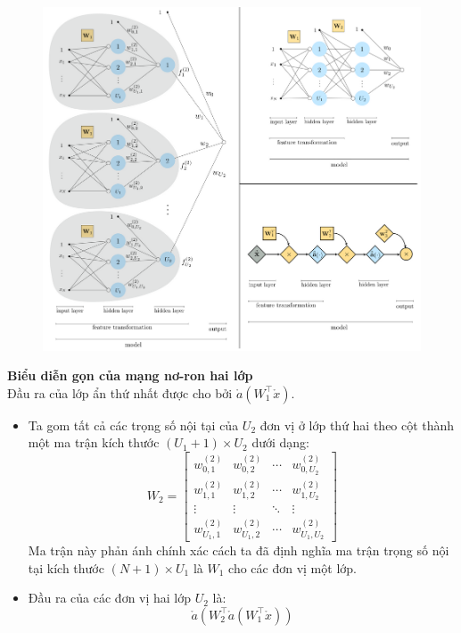\documentclass{book}
\begin{document}
    \begin{figure}[H]
        \centering
        \includegraphics[width=1.0\linewidth]{images/code23.png}
        \label{fig:code23}
    \end{figure}
    \textbf{Biểu diễn gọn của mạng nơ-ron hai lớp}\\
    Đầu ra của lớp ẩn thứ nhất được cho bởi $\mathring{a}(W_1^\top \mathring{x})$.
    \begin{itemize}
        \item Ta gom tất cả các trọng số nội tại của $U_2$ đơn vị ở lớp thứ hai theo cột thành một ma trận kích thước $(U_1 + 1) \times U_2$ dưới dạng:
        \[
        W_2 =
        \begin{bmatrix}
        w^{(2)}_{0,1} & w^{(2)}_{0,2} & \cdots & w^{(2)}_{0,U_2} \\
        w^{(2)}_{1,1} & w^{(2)}_{1,2} & \cdots & w^{(2)}_{1,U_2} \\
        \vdots        & \vdots        & \ddots & \vdots         \\
        w^{(2)}_{U_1,1} & w^{(2)}_{U_1,2} & \cdots & w^{(2)}_{U_1,U_2}
        \end{bmatrix} \tag{1}
        \]
        Ma trận này phản ánh chính xác cách ta đã định nghĩa ma trận trọng số nội tại kích thước $(N+1) \times U_1$ là $W_1$ cho các đơn vị một lớp.
        
        \item Đầu ra của các đơn vị hai lớp $U_2$ là:
        \[
        \mathring{a}\left(W_2^\top \mathring{a}\left(W_1^\top \mathring{x}\right)\right)
        \]
    \end{itemize}
\end{document}
